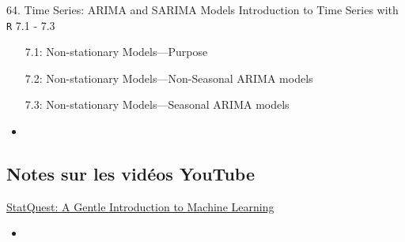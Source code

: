 \documentclass[12pt, titlepage, french]{report}
\begin{document}
\begin{CHPT_SUMM_AUTO}[label = {L.-64}]{64. Time Series: ARIMA and SARIMA Models}
Introduction to Time Series with \texttt{R} 7.1 - 7.3
\begin{itemize}
	\item[7.1:]	Non-stationary Models---Purpose
	\item[7.2:]	Non-stationary Models---Non-Seasonal ARIMA models
	\item[7.3:]	Non-stationary Models---Seasonal ARIMA models
\end{itemize}
\tcbline
	\begin{itemize}
		\item	
	\end{itemize}
\end{CHPT_SUMM_AUTO}

\subsection{Notes sur les vidéos YouTube}

\begin{YTB_SUMM}[label = {SQ-BASICS-ML-INTRO}]{\href{https://www.youtube.com/watch?v=Gv9_4yMHFhI&list=PLblh5JKOoLUICTaGLRoHQDuF_7q2GfuJF&index=2&t=0s}{StatQuest: A Gentle Introduction to Machine Learning}}
\begin{itemize}
	\item	
\end{itemize}
\end{YTB_SUMM}

\newpage
\end{document}
